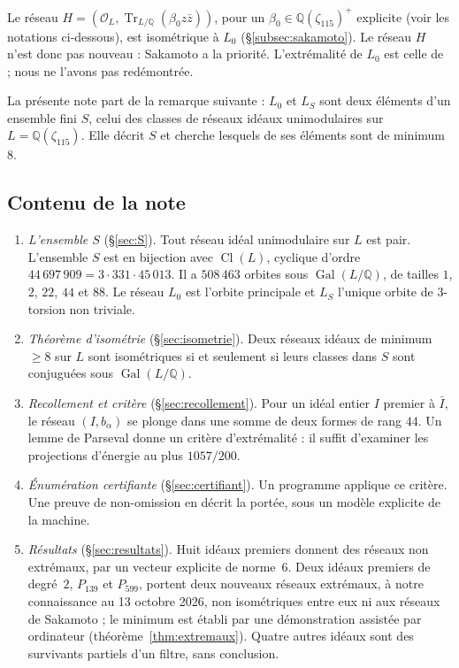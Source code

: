 \documentclass[11pt,a4paper]{amsart}
\theoremstyle{plain}
\theoremstyle{definition}
\numberwithin{equation}{section}
\newcommand{\Q}{\mathbb{Q}}
\newcommand{\OO}{\mathcal{O}}
\DeclareMathOperator{\Tr}{Tr}
\DeclareMathOperator{\Cl}{Cl}
\DeclareMathOperator{\Gal}{Gal}
\newcommand{\Lz}{L_{0}}
\newcommand{\LS}{L_{S}}
\begin{document}
Le réseau $H=(\OO_L,\Tr_{L/\Q}(\beta_0z\bar z))$, pour un $\beta_0\in\Q(\zeta_{115})^+$ explicite (voir les notations ci-dessous), est isométrique à $\Lz$ (\S\ref{subsec:sakamoto}). Le réseau $H$ n'est donc pas nouveau : Sakamoto a la priorité. L'extrémalité de $\Lz$ est celle de~\cite[prop.~5.5]{Sak26} ; nous ne l'avons pas redémontrée.

La présente note part de la remarque suivante : $\Lz$ et $\LS$ sont deux éléments d'un ensemble fini $S$, celui des classes de réseaux idéaux unimodulaires sur $L=\Q(\zeta_{115})$. Elle décrit $S$ et cherche lesquels de ses éléments sont de minimum $8$.

\subsection{Contenu de la note}
\begin{enumerate}[label=\textup{(\arabic*)}]
\item \emph{L'ensemble $S$} (\S\ref{sec:S}). Tout réseau idéal unimodulaire sur $L$ est pair. L'ensemble $S$ est en bijection avec $\Cl(L)$, cyclique d'ordre $44\,697\,909=3\cdot331\cdot45\,013$. Il a $508\,463$ orbites sous $\Gal(L/\Q)$, de tailles $1$, $2$, $22$, $44$ et $88$. Le réseau $\Lz$ est l'orbite principale et $\LS$ l'unique orbite de $3$-torsion non triviale.
\item \emph{Théorème d'isométrie} (\S\ref{sec:isometrie}). Deux réseaux idéaux de minimum $\ge8$ sur $L$ sont isométriques si et seulement si leurs classes dans $S$ sont conjuguées sous $\Gal(L/\Q)$.
\item \emph{Recollement et critère} (\S\ref{sec:recollement}). Pour un idéal entier $I$ premier à $\bar I$, le réseau $(I,b_\alpha)$ se plonge dans une somme de deux formes de rang $44$. Un lemme de Parseval donne un critère d'extrémalité : il suffit d'examiner les projections d'énergie au plus $1057/200$.
\item \emph{Énumération certifiante} (\S\ref{sec:certifiant}). Un programme applique ce critère. Une preuve de non-omission en décrit la portée, sous un modèle explicite de la machine.
\item \emph{Résultats} (\S\ref{sec:resultats}). Huit idéaux premiers donnent des réseaux non extrémaux, par un vecteur explicite de norme~$6$. Deux idéaux premiers de degré~$2$, $P_{139}$ et $P_{599}$, portent deux nouveaux réseaux extrémaux, à notre connaissance au 13 octobre 2026, non isométriques entre eux ni aux réseaux de Sakamoto ; le minimum est établi par une démonstration assistée par ordinateur (théorème~\ref{thm:extremaux}). Quatre autres idéaux sont des survivants partiels d'un filtre, sans conclusion.
\end{enumerate}
\end{document}
